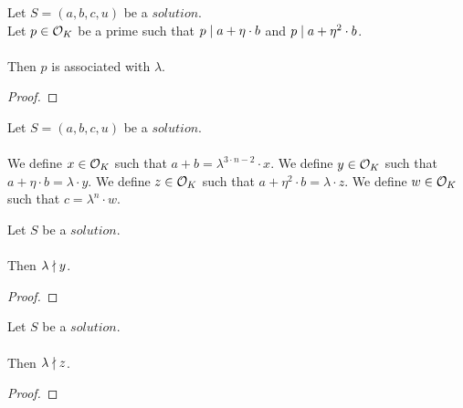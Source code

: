 \begin{lemma}
    \label{lmm:associated_of_dvd_a_add_eta_mul_b_of_dvd_a_add_eta_sq__mul_b}
    \leanok
    Let $S=(a, b, c, u)$ be a $solution$.\\
    Let $p \in \mathcal{O}_K$ be a prime such that $p \mid a+\eta \cdot b$
    and $p \mid a+\eta^2 \cdot b$.\\\\
    Then $p$ is associated with $\lambda$.
\end{lemma}
\begin{proof}
    \leanok
\end{proof}

\begin{definition}[$x,y,z,w$]
    \label{def:Solution_x_y_z_w}
    \leanok
    Let $S=(a, b, c, u)$ be a $solution$.\\\\
    We define $x \in \mathcal{O}_K$ such that $a + b = \lambda^{3\cdot n-2} \cdot x$.
    We define $y \in \mathcal{O}_K$ such that $a + \eta \cdot b = \lambda \cdot y$.
    We define $z \in \mathcal{O}_K$ such that $a + \eta^2 \cdot b = \lambda \cdot z$.
    We define $w \in \mathcal{O}_K$ such that $c = \lambda^n \cdot w$.
\end{definition}

\begin{lemma}
    \label{lmm:lambda_not_dvd_y}
    \leanok
    Let $S$ be a $solution$.\\\\
    Then $\lambda \nmid y$.
\end{lemma}
\begin{proof}
    \leanok
\end{proof}

\begin{lemma}
    \label{lmm:lambda_not_dvd_z}
    \leanok
    Let $S$ be a $solution$.\\\\
    Then $\lambda \nmid z$.
\end{lemma}
\begin{proof}
    \leanok
\end{proof}

